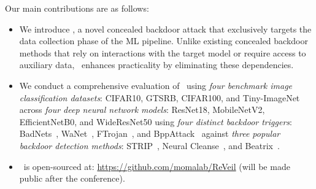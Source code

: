 Our main contributions are as follows:
\begin{itemize}
    \item We introduce \methodname, a novel concealed backdoor attack that exclusively targets the data collection phase of the ML pipeline. Unlike existing concealed backdoor methods that rely on interactions with the target model or require access to auxiliary data, \methodname~enhances practicality by eliminating these dependencies.
    \item We conduct a comprehensive evaluation of \methodname~using \textit{four benchmark image classification datasets}: CIFAR10, GTSRB, CIFAR100, and Tiny-ImageNet across \textit{four deep neural network models}: ResNet18, MobileNetV2, EfficientNetB0, and WideResNet50 using \textit{four distinct backdoor triggers}: BadNets~\cite{badnets}, WaNet~\cite{wanet}, FTrojan~\cite{ftrojan}, and BppAttack~\cite{bppattack} against \textit{three popular backdoor detection methods}: STRIP~\cite{strip}, Neural Cleanse~\cite{nc}, and Beatrix~\cite{beatrix}.
    \item \methodname~is open-sourced at: \url{https://github.com/momalab/ReVeil} (will be made public after the conference).
\end{itemize}

